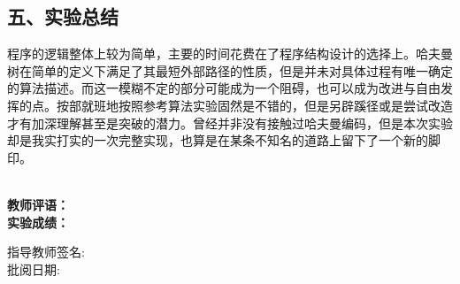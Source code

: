 \documentclass[UTF8, a4paper]{ctexart}
\begin{document}
\subsection*{五、实验总结}
程序的逻辑整体上较为简单，主要的时间花费在了程序结构设计的选择上。哈夫曼树在简单的定义下满足了其最短外部路径的性质，但是并未对具体过程有唯一确定的算法描述。而这一模糊不定的部分可能成为一个阻碍，也可以成为改进与自由发挥的点。按部就班地按照参考算法实验固然是不错的，但是另辟蹊径或是尝试改造才有加深理解甚至是突破的潜力。曾经并非没有接触过哈夫曼编码，但是本次实验却是我实打实的一次完整实现，也算是在某条不知名的道路上留下了一个新的脚印。

~\\
\textbf{教师评语：}
~\\
\textbf{实验成绩：}

\begin{flushright}
\mbox{指导教师签名:\qquad\qquad} \\
\mbox{批阅日期:\qquad\qquad}
\end{flushright}
\end{document}
